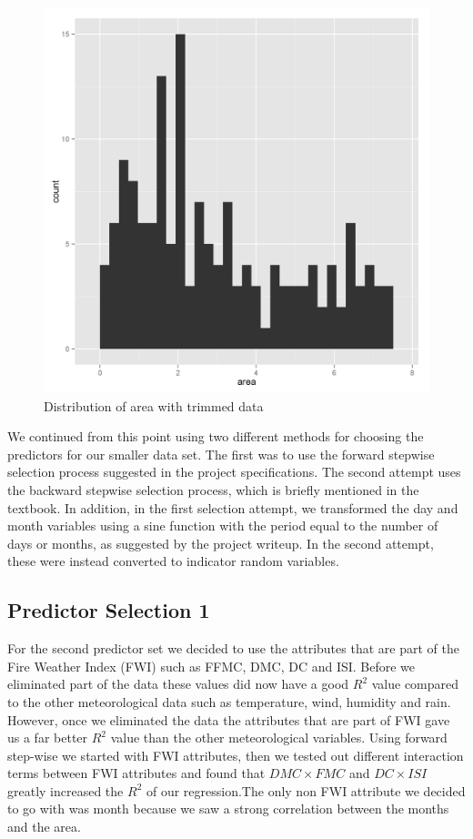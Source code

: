 \documentclass{article}
\begin{document}
\begin{figure}
\begin{minipage}[b]{0.45\linewidth}
  \includegraphics[width=\textwidth]{figures/goodhist.png}
  \caption{Distribution of area with trimmed data}
\end{minipage}
\end{figure}

We continued from this point using two different methods for choosing the
predictors for our smaller data set. The first was to use the forward stepwise
selection process suggested in the project specifications. The second attempt
uses the backward stepwise selection process, which is briefly mentioned in the
textbook. In addition, in the first selection attempt, we transformed the day
and month variables using a sine function with the period equal to the number
of days or months, as suggested by the project writeup. In the second attempt,
these were instead converted to indicator random variables.

\subsection{Predictor Selection 1}

For the second predictor set we decided to use the attributes that are part
of the Fire Weather Index (FWI) such as FFMC, DMC, DC and ISI. 
Before we eliminated part of the data these values did now have a good
$R^{2}$ value compared to the other meteorological data such as temperature,
wind, humidity and rain. However, once we eliminated the data the attributes
that are part of FWI gave us a far better $R^{2}$ value than the other
meteorological variables. Using forward step-wise we started with FWI attributes,
then we tested out different interaction terms between FWI attributes
and found that $DMC \times FMC$  and $DC \times ISI$ greatly increased
the $R^{2}$ of our regression.The only non FWI attribute we decided to
go with was month because we saw a strong correlation between the months
and the area.
\end{document}

